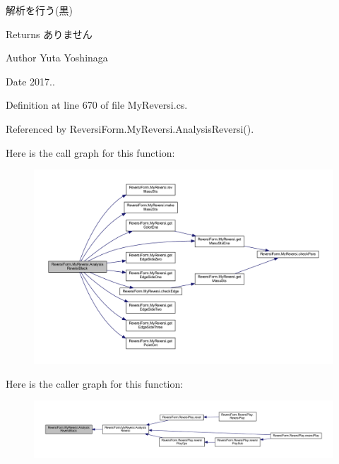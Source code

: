 解析を行う(黒) 

\begin{DoxyReturn}{Returns}
ありません 
\end{DoxyReturn}
\begin{DoxyAuthor}{Author}
Yuta Yoshinaga 
\end{DoxyAuthor}
\begin{DoxyDate}{Date}
2017.. 
\end{DoxyDate}


Definition at line 670 of file My\+Reversi.\+cs.



Referenced by Reversi\+Form.\+My\+Reversi.\+Analysis\+Reversi().

Here is the call graph for this function\+:
\nopagebreak
\begin{figure}[H]
\begin{center}
\leavevmode
\includegraphics[width=350pt]{class_reversi_form_1_1_my_reversi_adfa9fda128ee816da9b32009326c5a15_cgraph}
\end{center}
\end{figure}
Here is the caller graph for this function\+:
\nopagebreak
\begin{figure}[H]
\begin{center}
\leavevmode
\includegraphics[width=350pt]{class_reversi_form_1_1_my_reversi_adfa9fda128ee816da9b32009326c5a15_icgraph}
\end{center}
\end{figure}
\mbox{\label{class_reversi_form_1_1_my_reversi_a2fac17b7121d91063e2d759487f1ed18}} 
